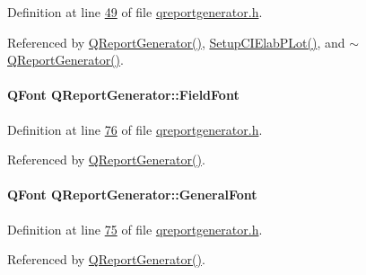 Definition at line \hyperlink{qreportgenerator_8h_source_l00049}{49} of file \hyperlink{qreportgenerator_8h_source}{qreportgenerator.\+h}.



Referenced by \hyperlink{qreportgenerator_8cpp_source_l00004}{Q\+Report\+Generator()}, \hyperlink{qreportgenerator_8cpp_source_l00431}{Setup\+C\+I\+Elab\+P\+Lot()}, and \hyperlink{qreportgenerator_8cpp_source_l00394}{$\sim$\+Q\+Report\+Generator()}.

\hypertarget{class_q_report_generator_ae23241660848e9015b6d3bf814d1b381}{}
\paragraph[{Field\+Font}]{\setlength{\rightskip}{0pt plus 5cm}Q\+Font Q\+Report\+Generator\+::\+Field\+Font\hspace{0.3cm}{\ttfamily [private]}}\label{class_q_report_generator_ae23241660848e9015b6d3bf814d1b381}


Definition at line \hyperlink{qreportgenerator_8h_source_l00076}{76} of file \hyperlink{qreportgenerator_8h_source}{qreportgenerator.\+h}.



Referenced by \hyperlink{qreportgenerator_8cpp_source_l00004}{Q\+Report\+Generator()}.

\hypertarget{class_q_report_generator_ab7022962a87365f93a5e168d946ebd85}{}
\paragraph[{General\+Font}]{\setlength{\rightskip}{0pt plus 5cm}Q\+Font Q\+Report\+Generator\+::\+General\+Font\hspace{0.3cm}{\ttfamily [private]}}\label{class_q_report_generator_ab7022962a87365f93a5e168d946ebd85}


Definition at line \hyperlink{qreportgenerator_8h_source_l00075}{75} of file \hyperlink{qreportgenerator_8h_source}{qreportgenerator.\+h}.



Referenced by \hyperlink{qreportgenerator_8cpp_source_l00004}{Q\+Report\+Generator()}.

\hypertarget{class_q_report_generator_a9a18bc94ca92a730ae0f13d60a6b5e0a}{}
